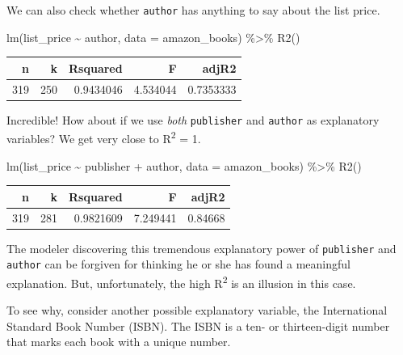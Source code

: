 \documentclass[
  letterpaper,
  DIV=11,
  numbers=noendperiod,
  oneside]{scrreprt}
\newenvironment{Shaded}{\begin{snugshade}}{\end{snugshade}}
\newcommand{\AttributeTok}[1]{\textcolor[rgb]{0.40,0.45,0.13}{#1}}
\newcommand{\FunctionTok}[1]{\textcolor[rgb]{0.28,0.35,0.67}{#1}}
\newcommand{\NormalTok}[1]{\textcolor[rgb]{0.00,0.23,0.31}{#1}}
\newcommand{\SpecialCharTok}[1]{\textcolor[rgb]{0.37,0.37,0.37}{#1}}
\begin{document}
We can also check whether \texttt{author} has anything to say about the
list price.

\begin{Shaded}
\begin{Highlighting}[]
\FunctionTok{lm}\NormalTok{(list\_price }\SpecialCharTok{\textasciitilde{}}\NormalTok{ author, }\AttributeTok{data =}\NormalTok{ amazon\_books) }\SpecialCharTok{\%\textgreater{}\%} \FunctionTok{R2}\NormalTok{()}
\end{Highlighting}
\end{Shaded}

\ttfamily 
\begin{tabular}{rrrrr}
\toprule
n & k & Rsquared & F & adjR2\\
\midrule
319 & 250 & 0.9434046 & 4.534044 & 0.7353333\\
\bottomrule
\end{tabular} \normalfont
\bigskip

Incredible! How about if we use \emph{both} \texttt{publisher} and
\texttt{author} as explanatory variables? We get very close to
R\textsuperscript{2} = 1.

\begin{Shaded}
\begin{Highlighting}[]
\FunctionTok{lm}\NormalTok{(list\_price }\SpecialCharTok{\textasciitilde{}}\NormalTok{ publisher }\SpecialCharTok{+}\NormalTok{ author, }\AttributeTok{data =}\NormalTok{ amazon\_books) }\SpecialCharTok{\%\textgreater{}\%}
  \FunctionTok{R2}\NormalTok{()}
\end{Highlighting}
\end{Shaded}

\ttfamily 
\begin{tabular}{rrrrr}
\toprule
n & k & Rsquared & F & adjR2\\
\midrule
319 & 281 & 0.9821609 & 7.249441 & 0.84668\\
\bottomrule
\end{tabular} \normalfont
\bigskip

The modeler discovering this tremendous explanatory power of
\texttt{publisher} and \texttt{author} can be forgiven for thinking he
or she has found a meaningful explanation. But, unfortunately, the high
R\textsuperscript{2} is an illusion in this case.

To see why, consider another possible explanatory variable, the
International Standard Book Number (ISBN). The ISBN is a ten- or
thirteen-digit number that marks each book with a unique number.
\end{document}
